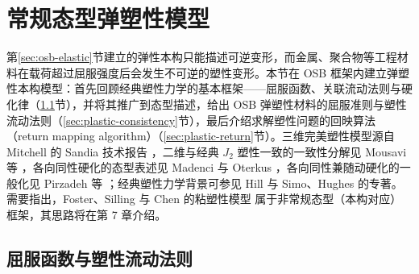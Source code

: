 
\section{常规态型弹塑性模型}\label{sec:osb-plastic}

第\ref{sec:osb-elastic}节建立的弹性本构只能描述可逆变形，而金属、聚合物等工程材料在载荷超过屈服强度后会发生不可逆的塑性变形。本节在 OSB 框架内建立弹塑性本构模型：首先回顾经典塑性力学的基本框架——屈服函数、关联流动法则与硬化律（\ref{sec:plastic-yield}节），并将其推广到态型描述，给出 OSB 弹塑性材料的屈服准则与塑性流动法则（\ref{sec:plastic-consistency}节），最后介绍求解塑性问题的回映算法（return mapping algorithm）（\ref{sec:plastic-return}节）。三维完美塑性模型源自 Mitchell 的 Sandia 技术报告 \cite{Mitchell2011}，二维与经典 $J_{2}$ 塑性一致的一致性分解见 Mousavi 等 \cite{Mousavi2021}，各向同性硬化的态型表述见 Madenci 与 Oterkus \cite{MadenciOterkus2016}，各向同性兼随动硬化的一般化见 Pirzadeh 等 \cite{Pirzadeh2024}；经典塑性力学背景可参见 Hill \cite{Hill1950} 与 Simo、Hughes \cite{SimoHughes1998} 的专著。需要指出，Foster、Silling 与 Chen 的粘塑性模型 \cite{Foster2010} 属于非常规态型（本构对应）框架，其思路将在第 7 章介绍。

\subsection{屈服函数与塑性流动法则}\label{sec:plastic-yield}

